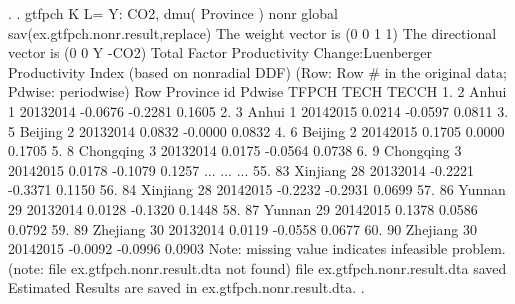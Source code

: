 . 
. gtfpch K L= Y: CO2, dmu( Province ) nonr  global sav(ex.gtfpch.nonr.result,replace)
{\smallskip}
 The weight vector is (0 0 1 1)
{\smallskip}
 The directional vector is (0 0 Y -CO2)
{\smallskip}
{\smallskip}
 Total Factor Productivity Change:Luenberger Productivity Index (based on nonradial DDF)
    (Row: Row \# in the original data; Pdwise: periodwise)
{\smallskip}
     {\TLC}
     {\VBAR} Row       Province   id      Pdwise     TFPCH      TECH    TECCH {\VBAR}
     {\LFTT}
  1. {\VBAR}   2          Anhui    1   2013{\tytilde}2014   -0.0676   -0.2281   0.1605 {\VBAR}
  2. {\VBAR}   3          Anhui    1   2014{\tytilde}2015    0.0214   -0.0597   0.0811 {\VBAR}
  3. {\VBAR}   5        Beijing    2   2013{\tytilde}2014    0.0832   -0.0000   0.0832 {\VBAR}
  4. {\VBAR}   6        Beijing    2   2014{\tytilde}2015    0.1705    0.0000   0.1705 {\VBAR}
  5. {\VBAR}   8      Chongqing    3   2013{\tytilde}2014    0.0175   -0.0564   0.0738 {\VBAR}
  6. {\VBAR}   9      Chongqing    3   2014{\tytilde}2015    0.0178   -0.1079   0.1257 {\VBAR}
                                     ...
                                     ...
                                     ...
 55. {\VBAR}  83       Xinjiang   28   2013{\tytilde}2014   -0.2221   -0.3371   0.1150 {\VBAR}
 56. {\VBAR}  84       Xinjiang   28   2014{\tytilde}2015   -0.2232   -0.2931   0.0699 {\VBAR}
 57. {\VBAR}  86         Yunnan   29   2013{\tytilde}2014    0.0128   -0.1320   0.1448 {\VBAR}
 58. {\VBAR}  87         Yunnan   29   2014{\tytilde}2015    0.1378    0.0586   0.0792 {\VBAR}
 59. {\VBAR}  89       Zhejiang   30   2013{\tytilde}2014    0.0119   -0.0558   0.0677 {\VBAR}
 60. {\VBAR}  90       Zhejiang   30   2014{\tytilde}2015   -0.0092   -0.0996   0.0903 {\VBAR}
     {\BLC}
Note: missing value indicates infeasible problem.
(note: file ex.gtfpch.nonr.result.dta not found)
file ex.gtfpch.nonr.result.dta saved
{\smallskip}
Estimated Results are saved in ex.gtfpch.nonr.result.dta.
{\smallskip}
. 
